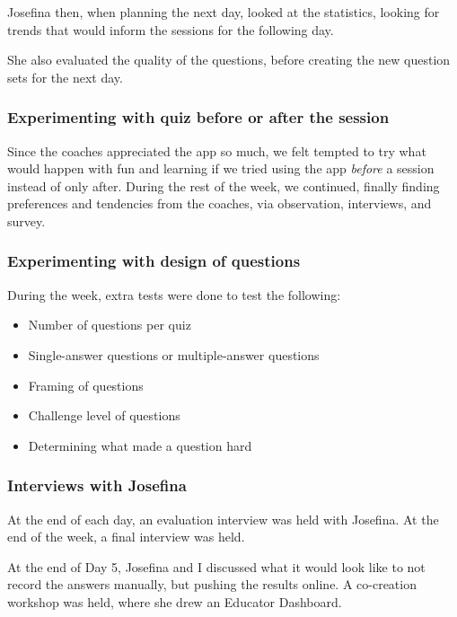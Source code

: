 Josefina then, when planning the next day, looked at the statistics, looking for trends that would inform the sessions for the following day.

She also evaluated the quality of the questions, before creating the new question sets for the next day.

\subsubsection{Experimenting with quiz before or after the session}
Since the coaches appreciated the app so much, we felt tempted to try what would happen with fun and learning if we tried using the app \textit{before} a session instead of only after. During the rest of the week, we continued, finally finding preferences and tendencies from the coaches, via observation, interviews, and survey.

\subsubsection{Experimenting with design of questions}
During the week, extra tests were done to test the following:

\begin{itemize}
\item Number of questions per quiz
\item Single-answer questions or multiple-answer questions
\item Framing of questions
\item Challenge level of questions
\item Determining what made a question hard
\end{itemize}

\subsubsection{Interviews with Josefina}
At the end of each day, an evaluation interview was held with Josefina. At the end of the week, a final interview was held.

At the end of Day 5, Josefina and I discussed what it would look like to not record the answers manually, but pushing the results online. A co-creation workshop was held, where she drew an Educator Dashboard.
